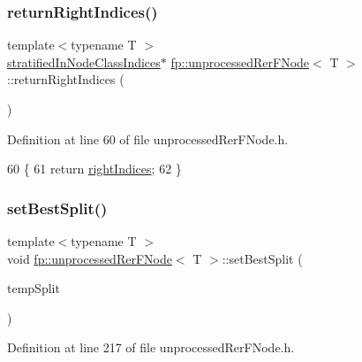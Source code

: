 \subsubsection{\texorpdfstring{return\+Right\+Indices()}{returnRightIndices()}}
{\footnotesize\ttfamily template$<$typename T $>$ \\
\hyperlink{classfp_1_1stratifiedInNodeClassIndices}{stratified\+In\+Node\+Class\+Indices}$\ast$ \hyperlink{classfp_1_1unprocessedRerFNode}{fp\+::unprocessed\+Rer\+F\+Node}$<$ T $>$\+::return\+Right\+Indices (\begin{DoxyParamCaption}{ }\end{DoxyParamCaption})\hspace{0.3cm}{\ttfamily [inline]}}



Definition at line 60 of file unprocessed\+Rer\+F\+Node.\+h.


\begin{DoxyCode}
60                                                                          \{
61                     \textcolor{keywordflow}{return} \hyperlink{classfp_1_1unprocessedRerFNode_a4cc97ffcfe51937766fed926bbc4892a}{rightIndices};
62                 \}
\end{DoxyCode}
\mbox{\label{classfp_1_1unprocessedRerFNode_ac31049fede0262a8879905802884fe6f}} 
\subsubsection{\texorpdfstring{set\+Best\+Split()}{setBestSplit()}}
{\footnotesize\ttfamily template$<$typename T $>$ \\
void \hyperlink{classfp_1_1unprocessedRerFNode}{fp\+::unprocessed\+Rer\+F\+Node}$<$ T $>$\+::set\+Best\+Split (\begin{DoxyParamCaption}\item[{\hyperlink{classfp_1_1splitRerFInfo}{split\+Rer\+F\+Info}$<$ T $>$}]{temp\+Split }\end{DoxyParamCaption})\hspace{0.3cm}{\ttfamily [inline]}}



Definition at line 217 of file unprocessed\+Rer\+F\+Node.\+h.


